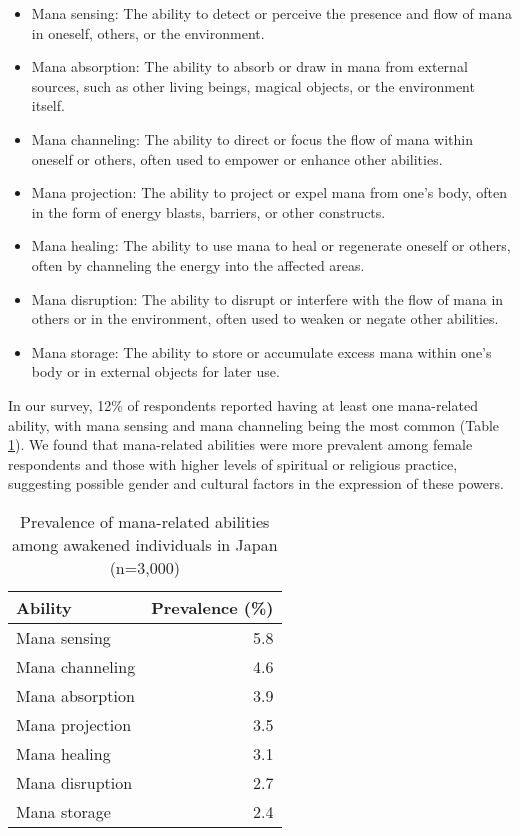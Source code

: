 \documentclass[12pt]{article}
\begin{document}
\begin{itemize}
    \item Mana sensing: The ability to detect or perceive the presence and flow of mana in oneself, others, or the environment.
    \item Mana absorption: The ability to absorb or draw in mana from external sources, such as other living beings, magical objects, or the environment itself.
    \item Mana channeling: The ability to direct or focus the flow of mana within oneself or others, often used to empower or enhance other abilities.
    \item Mana projection: The ability to project or expel mana from one's body, often in the form of energy blasts, barriers, or other constructs.
    \item Mana healing: The ability to use mana to heal or regenerate oneself or others, often by channeling the energy into the affected areas.
    \item Mana disruption: The ability to disrupt or interfere with the flow of mana in others or in the environment, often used to weaken or negate other abilities.
    \item Mana storage: The ability to store or accumulate excess mana within one's body or in external objects for later use.
\end{itemize}

In our survey, 12\% of respondents reported having at least one mana-related ability, with mana sensing and mana channeling being the most common (Table \ref{tab:manaabilities}). We found that mana-related abilities were more prevalent among female respondents and those with higher levels of spiritual or religious practice, suggesting possible gender and cultural factors in the expression of these powers.

\begin{table}[h]
\centering
\caption{Prevalence of mana-related abilities among awakened individuals in Japan (n=3,000)}
\label{tab:manaabilities}
\begin{tabular}{lr}
\toprule
Ability & Prevalence (\%) \\
\midrule
Mana sensing & 5.8 \\
Mana channeling & 4.6 \\
Mana absorption & 3.9 \\
Mana projection & 3.5 \\
Mana healing & 3.1 \\
Mana disruption & 2.7 \\
Mana storage & 2.4 \\
\bottomrule
\end{tabular}
\end{table}
\end{document}
